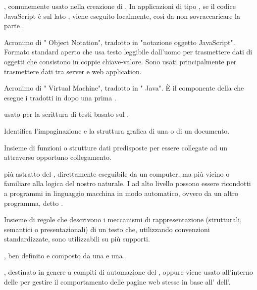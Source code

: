 { , comunemente usato nella creazione di . In applicazioni di tipo , se il codice JavaScript è sul lato , viene eseguito localmente, così da non sovraccaricare la parte .}

{Acronimo di " Object Notation", tradotto in "notazione oggetto JavaScript". Formato standard aperto che usa testo leggibile dall'uomo per trasmettere dati di oggetti che consistono in coppie chiave-valore. Sono usati principalmente per trasmettere dati tra server e web application.}

{Acronimo di " Virtual Machine", tradotto in " Java". \`{E} il componente della  che esegue i  tradotti in  dopo una prima .}




{ usato per la scrittura di testi basato sul  .}

{Identifica l'impaginazione e la struttura grafica di una  o di un documento.}

{Insieme di funzioni o strutture dati predisposte per essere collegate ad un   attraverso opportuno collegamento.}

{ più astratto del , direttamente eseguibile da un computer, ma più vicino o familiare alla logica del nostro  naturale. I  ad alto livello possono essere ricondotti a programmi in linguaggio macchina in modo automatico, ovvero da un altro programma, detto .}

{Insieme di regole che descrivono i meccanismi di rappresentazione (strutturali, semantici o presentazionali) di un testo che, utilizzando convenzioni standardizzate, sono utilizzabili su più supporti.}

{, ben definito e composto da una  e una .}

{, destinato in genere a compiti di automazione del , oppure viene usato all'interno delle  per gestire il comportamento delle pagine web stesse in base all'  dell'.}

